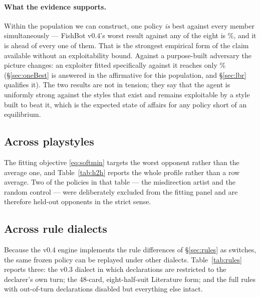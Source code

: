 \paragraph{What the evidence supports.} Within the population we can construct,
one policy \emph{is} best against every member simultaneously --- FishBot v0.4's
worst result against any of the eight is \numWorstCase\%, and it is ahead of
every one of them. That is the strongest empirical form of the claim available
without an exploitability bound. Against a purpose-built adversary the picture
changes: an exploiter fitted specifically against it reaches only \numLBRFour\%
(\S\ref{sec:oneBest} is answered in the affirmative for this population, and
\S\ref{sec:lbr} qualifies it). The two results are not in
tension; they say that the agent is uniformly strong against the styles that
exist and remains exploitable by a style built to beat it, which is the expected
state of affairs for any policy short of an equilibrium.

\subsection{Across playstyles}

The fitting objective \eqref{eq:softmin} targets the worst opponent rather than
the average one, and Table~\ref{tab:h2h} reports the whole profile rather than a
row average. Two of the policies in that table --- the misdirection artist and
the random control --- were deliberately excluded from the fitting panel and are
therefore held-out opponents in the strict sense.

\subsection{Across rule dialects}

Because the v0.4 engine implements the rule differences of \S\ref{sec:rules} as
switches, the same frozen policy can be replayed under other dialects.
Table~\ref{tab:rules} reports three: the v0.3 dialect in which declarations are
restricted to the declarer's own turn; the 48-card, eight-half-suit Literature
form; and the full rules with out-of-turn declarations disabled but everything
else intact.

\begin{table}[ht]
\centering
\caption{The frozen FishBot v0.4 configuration replayed under other rule
dialects.}
\label{tab:rules}
\small

\end{table}

